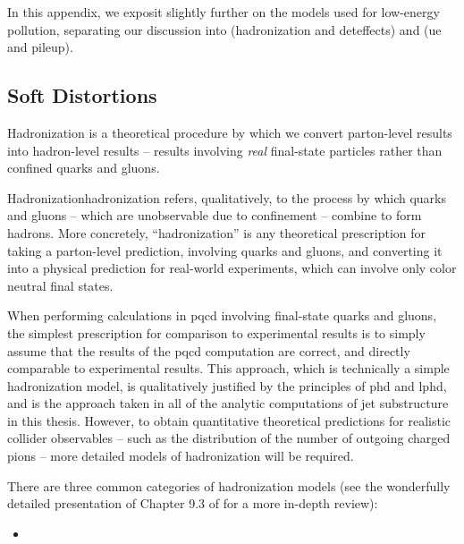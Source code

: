 \begin{subappendices}
In this appendix, we exposit slightly further on the models used for low-energy pollution, separating our discussion into  (\gls{hadronization} and \gls{deteffects}) and  (\gls{ue} and \gls{pileup}).

\subsection{Soft Distortions}
\label{app:soft-distortions}

Hadronization is a theoretical procedure by which we convert parton-level results into hadron-level results -- results involving \textit{real} final-state particles rather than confined quarks and gluons.

\begin{definitionbox}{Hadronization}{hadronization}
     refers, qualitatively, to the process by which quarks and gluons -- which are unobservable due to confinement -- combine to form hadrons.
    More concretely, ``hadronization'' is any theoretical prescription for taking a parton-level prediction, involving quarks and gluons, and converting it into a physical prediction for real-world experiments, which can involve only color neutral final states.
\end{definitionbox}


When performing calculations in \gls{pqcd} involving final-state quarks and gluons, the simplest prescription for comparison to experimental results is to simply assume that the results of the \gls{pqcd} computation are correct, and directly comparable to experimental results.
%
This approach, which is technically a simple hadronization model, is qualitatively justified by the principles of \gls{phd} and \gls{lphd}, and is the approach taken in all of the analytic computations of jet substructure in this thesis.
%
However, to obtain quantitative theoretical predictions for realistic collider observables -- such as the distribution of the number of outgoing charged pions -- more detailed models of hadronization will be required.


There are three common categories of hadronization models (see the wonderfully detailed presentation of Chapter 9.3 of  for a more in-depth review):
\begin{itemize}
    \item


\end{itemize}
\end{subappendices}
